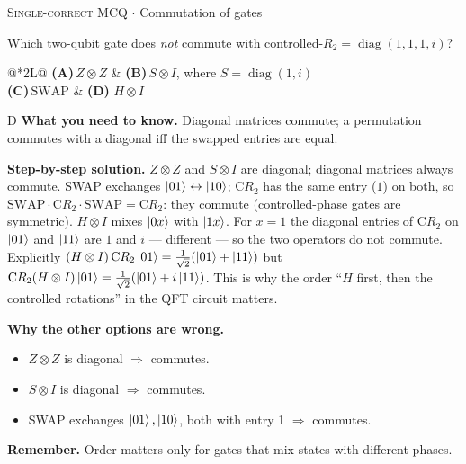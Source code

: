 \documentclass[11pt,a4paper]{article}
\newcommand{\optlabel}[1]{\textbf{(#1)}}
\newcommand{\correctlabel}[1]{\textcolor{okgreen}{\textbf{(#1)}\,\ding{51}}}
\newenvironment{qitem}[1]{\begin{list}{}{\setlength{\leftmargin}{3.3em}\setlength{\labelwidth}{3.1em}%
  \setlength{\labelsep}{0.2em}\setlength{\topsep}{3pt}\setlength{\parsep}{3pt}}\item[\textbf{Q.#1}\hfill]}{\end{list}}
\newcommand{\qsep}{\par\vspace{2pt}{\color{black!15}\hrule}\vspace{4pt}}
\newcommand{\qmeta}[2]{{\footnotesize\color{black!60}\textsc{#1} \;$\cdot$\; #2}\par}
\begin{document}
\begin{qitem}{31}
\qmeta{Single-correct MCQ}{Commutation of gates}
Which two-qubit gate does \emph{not} commute with controlled-$R_2 = \operatorname{diag}(1, 1, 1, i)$?
\par\smallskip\noindent\begin{tabularx}{\linewidth}{@{}*{2}{L}@{}}
\optlabel{A}\,$Z\otimes Z$ & \optlabel{B}\,$S\otimes I$, where $S = \operatorname{diag}(1, i)$ \\[3pt]
\optlabel{C}\,$\mathrm{SWAP}$ & \correctlabel{D}\,$H\otimes I$
\end{tabularx}
\end{qitem}
\begin{solbox}{D}
\textbf{\color{brand}What you need to know.} Diagonal matrices commute; a permutation commutes with a diagonal iff the swapped entries are equal.

\textbf{\color{brand}Step-by-step solution.} $Z\otimes Z$ and $S \otimes I$ are diagonal; diagonal matrices always commute.
SWAP exchanges $\ket{01} \leftrightarrow \ket{10}$; $\mathrm{C}R_2$ has the same entry ($1$) on both, so
$\mathrm{SWAP}\cdot\mathrm{C}R_2\cdot\mathrm{SWAP} = \mathrm{C}R_2$: they commute (controlled-phase gates are symmetric).
$H\otimes I$ mixes $\ket{0x}$ with $\ket{1x}$. For $x = 1$ the diagonal entries of $\mathrm{C}R_2$ on $\ket{01}$ and $\ket{11}$ are
$1$ and $i$ --- different --- so the two operators do not commute. Explicitly
$(H\otimes I)\,\mathrm{C}R_2\ket{01} = \frac{1}{\sqrt2}(\ket{01} + \ket{11})$ but $\mathrm{C}R_2(H\otimes I)\ket{01} = \frac{1}{\sqrt2}(\ket{01} + i\ket{11})$.
This is why the order ``$H$ first, then the controlled rotations'' in the QFT circuit matters.

\textbf{\color{brand}Why the other options are wrong.}
\begin{itemize}[leftmargin=2.4em, itemsep=1pt, topsep=2pt]
\item[\textbf{(A)}] $Z\otimes Z$ is diagonal $\Rightarrow$ commutes.
\item[\textbf{(B)}] $S\otimes I$ is diagonal $\Rightarrow$ commutes.
\item[\textbf{(C)}] SWAP exchanges $\ket{01},\ket{10}$, both with entry 1 $\Rightarrow$ commutes.
\end{itemize}
\textbf{\color{brand}Remember.} Order matters only for gates that mix states with different phases.
\end{solbox}
\qsep
\end{document}
